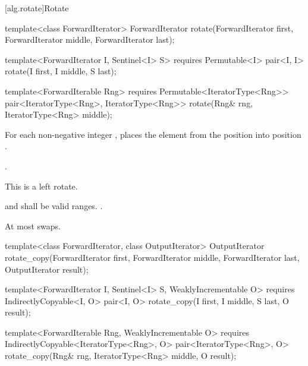 [alg.rotate]{Rotate}

%
\begin{removedblock}
\begin{itemdecl}
template<class ForwardIterator>
  ForwardIterator rotate(ForwardIterator first, ForwardIterator middle,
              ForwardIterator last);
\end{itemdecl}
\end{removedblock}
\begin{addedblock}
\begin{itemdecl}
template<ForwardIterator I, Sentinel<I> S>
  requires Permutable<I>
  pair<I, I> rotate(I first, I middle, S last);

template<ForwardIterable Rng>
  requires Permutable<IteratorType<Rng>>
  pair<IteratorType<Rng>, IteratorType<Rng>>
    rotate(Rng& rng, IteratorType<Rng> middle);
\end{itemdecl}
\end{addedblock}

\begin{itemdescr}
\pnum
\effects
For each non-negative integer
,
places the element from the position
into position
.


\pnum
\returns {}.

\pnum
\notes
This is a left rotate.

\pnum
\requires
{}
and
shall be valid ranges.
.

\pnum
\complexity
At most
swaps.
\end{itemdescr}

%
\begin{removedblock}
\begin{itemdecl}
template<class ForwardIterator, class OutputIterator>
  OutputIterator
    rotate_copy(ForwardIterator first, ForwardIterator middle,
                ForwardIterator last, OutputIterator result);
\end{itemdecl}
\end{removedblock}
\begin{addedblock}
\begin{itemdecl}
template<ForwardIterator I, Sentinel<I> S, WeaklyIncrementable O>
  requires IndirectlyCopyable<I, O>
  pair<I, O>
    rotate_copy(I first, I middle, S last, O result);

template<ForwardIterable Rng, WeaklyIncrementable O>
  requires IndirectlyCopyable<IteratorType<Rng>, O>
  pair<IteratorType<Rng>, O>
    rotate_copy(Rng& rng, IteratorType<Rng> middle, O result);
\end{itemdecl}
\end{addedblock}

